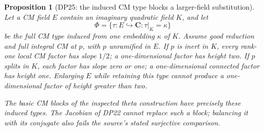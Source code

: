 \documentclass[11pt,a4paper]{article}
\newtheorem{proposition}[theorem]{Proposition}
\theoremstyle{definition}\newtheorem{remark}[theorem]{Remark}
\begin{document}
\begin{proposition}[DP25: the induced CM type blocks a larger-field substitution]\label{DP25}
Let a CM field $E$ contain an imaginary quadratic field $K$, and let
\[
 \Phi=\{\tau:E\hookrightarrow\mathbf C:\tau|_K=\kappa\}
\]
be the full CM type induced from one embedding $\kappa$ of $K$. Assume good reduction and full integral CM at $p$, with $p$ unramified in $E$. If $p$ is inert in $K$, every rank-one local CM factor has slope $1/2$; a one-dimensional factor has height two. If $p$ splits in $K$, each factor has slope zero or one; a one-dimensional connected factor has height one. Enlarging $E$ while retaining this type cannot produce a one-dimensional factor of height greater than two.

The basic CM blocks of the inspected theta construction have precisely these induced types. The Jacobian of DP22 cannot replace such a block; balancing it with its conjugate also fails the source's stated surjective comparison.
\end{proposition}
\end{document}
